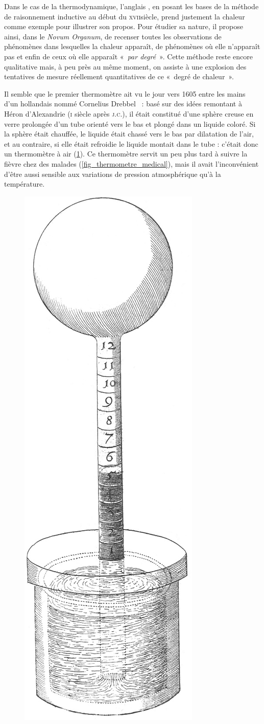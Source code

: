 	Dans le cas de la thermodynamique, l’anglais , en posant les bases de la méthode de raisonnement inductive au début du \textsc{xvii}\ieme siècle, prend justement la chaleur comme exemple pour illustrer son propos. Pour étudier sa nature, il propose ainsi, dans le \textit{Novum Organum}, de recenser toutes les observations de phénomènes dans lesquelles la chaleur apparaît, de phénomènes où elle n'apparaît pas et enfin de ceux où elle apparaît «~\emph{par degré}~». Cette méthode reste encore qualitative mais, à peu près au même moment, on assiste à une explosion des tentatives de mesure réellement quantitatives de ce «~degré de chaleur~».
	
	Il semble que le premier thermomètre ait vu le jour vers 1605 entre les mains d'un hollandais nommé Cornelius Drebbel~\cite{locqueneux1996} : basé sur des idées remontant à Héron d'Alexandrie (\textsc{i}\xspace siècle après \textsc{j.c.}), il était constitué d'une sphère creuse en verre prolongée d'un tube orienté vers le bas et plongé dans un liquide coloré. Si la sphère était chauffée, le liquide était chassé vers le bas par dilatation de l'air, et au contraire, si elle était refroidie le liquide montait dans le tube : c'était donc un thermomètre à air (\cref{fig_thermometre_air}). Ce thermomètre servit un peu plus tard à suivre la fièvre chez des malades (\cref{fig_thermometre_medical}), mais il avait l'inconvénient d'être aussi sensible aux variations de pression atmosphérique qu'à la température.
	
	\begin{figure}
		\begin{center}
			\includegraphics[height=0.6\textwidth]{images/thermometre_air_1626.jpg}
		\end{center}
		\label{fig_thermometre_air}
	\end{figure}
	
